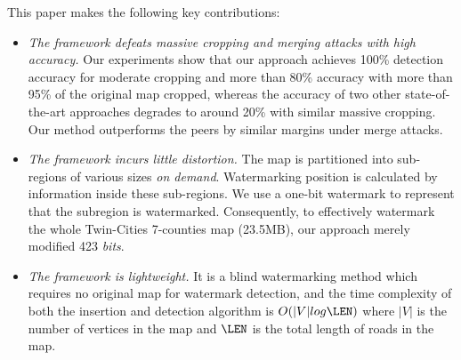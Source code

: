 %
This paper makes the following key contributions:
\begin{itemize}
\item {\em The framework defeats massive cropping and merging
attacks with high accuracy.} Our experiments show that
our approach achieves 100\% detection accuracy for moderate
cropping and more than 80\% accuracy with more than 95\% of the original
map cropped, whereas the accuracy of two other state-of-the-art approaches
degrades to around 20\% with similar massive cropping. Our method outperforms
the peers by similar margins under merge attacks. 


\item {\em The framework incurs little distortion.} 
The map is partitioned into sub-regions of various sizes {\em on demand}. 
Watermarking position is calculated by information inside these sub-regions. 
We use a one-bit watermark to represent that the 
subregion is watermarked.  Consequently, to effectively watermark the whole
Twin-Cities 7-counties map (23.5MB), our approach merely modified 
423 {\em bits}. 

\item {\em The framework is lightweight.} It is a blind watermarking method
which requires no original map for watermark detection, 
and the time complexity of both the insertion
and detection algorithm is $O(|V|log\LEN)$ where $|V|$ is the number of vertices in
the map and $\LEN$ is the total length of roads in the map.
\end{itemize}

